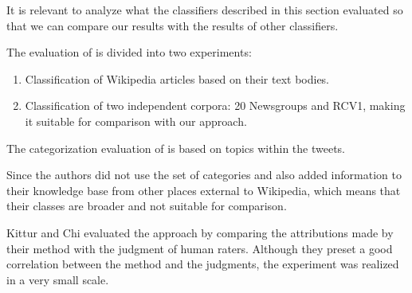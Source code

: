 It is relevant to analyze what the classifiers described in this section evaluated so that we can compare our results with the results of other classifiers. 

The evaluation of \cite{schonhofen2009identifying} is divided into two experiments: 

\begin{enumerate}

\item Classification of Wikipedia articles based on their text bodies.
\item Classification of two independent corpora: 20 Newsgroups and RCV1, making it suitable for comparison with our approach.

\end{enumerate}


The categorization evaluation of \cite{gattani2013entity} is based on topics within the tweets.

Since the authors did not use the set of categories and also added information to their knowledge
base from other places external to Wikipedia, which means that their classes are broader and not suitable for comparison. 

Kittur and Chi \cite{kittur2009s} evaluated the approach by comparing the attributions made by their method with the judgment of human raters. Although they preset a good correlation between the method and the judgments, the experiment was realized in a very small scale. 

